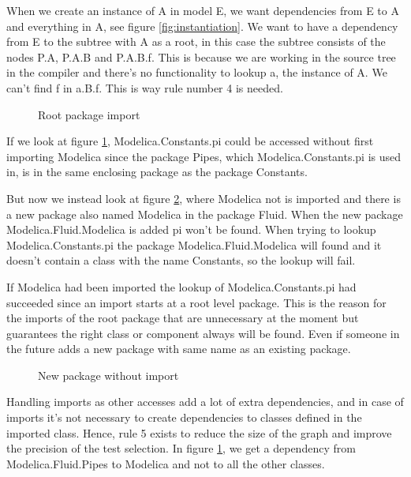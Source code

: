 \documentclass{cslthse-msc}
\begin{document}
When we create an instance of A in model E, we want dependencies from E to A and everything in A, see figure \ref{fig:instantiation}. We want to have a dependency from E to the subtree with A as a root, in this case the subtree consists of the nodes P.A, P.A.B and P.A.B.f. This is because we are working in the source tree in the compiler and there's no functionality to lookup a, the instance of A. We can't find f in a.B.f. This is way rule number 4 is needed.

\begin{figure}[H]
    \centering
    
    \caption{Root package import}
    \label{fig:importRootPackage}
\end{figure}

If we look at figure \ref{fig:importRootPackage}, Modelica.Constants.pi could be accessed without first importing Modelica since the package Pipes, which Modelica.Constants.pi is used in, is in the same enclosing package as the package Constants.

But now we instead look at figure \ref{fig:newPackageWithoutImport}, where Modelica not is imported and there is a new package also named Modelica in the package Fluid. When the new package Modelica.Fluid.Modelica is added pi won't be found. When trying to lookup Modelica.Constants.pi the package Modelica.Fluid.Modelica will found and it doesn't contain a class with the name Constants, so the lookup will fail.

If Modelica had been imported the lookup of Modelica.Constants.pi had succeeded since an import starts at a root level package. This is the reason for the imports of the root package that are unnecessary at the moment but guarantees the right class or component always will be found. Even if someone in the future adds a new package with same name as an existing package.

\begin{figure}[H]
    \centering
    
    \caption{New package without import}
    \label{fig:newPackageWithoutImport}
\end{figure}

Handling imports as other accesses add a lot of extra dependencies, and in case of imports it's not necessary to create dependencies to classes defined in the imported class. Hence, rule 5 exists to reduce the size of the graph and improve the precision of the test selection. In figure \ref{fig:importRootPackage}, we get a dependency from Modelica.Fluid.Pipes to Modelica and not to all the other classes.
\end{document}

